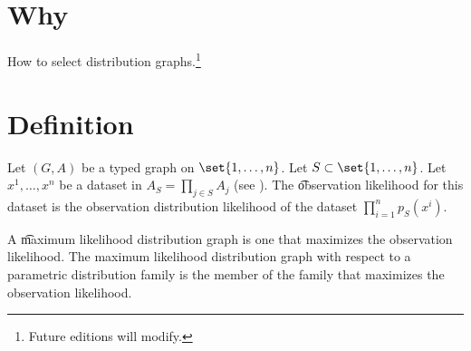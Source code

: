 
\section*{Why}

How to select distribution graphs.\footnote{Future editions will modify.}

\section*{Definition}

Let $(G, A)$ be a typed graph on $\set{1, \dots , n}$.
Let $S \subset \set{1, \dots , n}$.
Let $x^1, \dots , x^n$ be a dataset in $A_S = \prod_{j \in S} A_j$ (see ).
The \t{observation likelihood} for this dataset is the observation distribution likelihood of the dataset $\prod_{i =1}^{n} p_S(x^i)$.

A \t{maximum likelihood distribution graph} is one that maximizes the observation likelihood.
The maximum likelihood distribution graph with respect to a parametric distribution family is the member of the family that maximizes the observation likelihood.

\blankpage